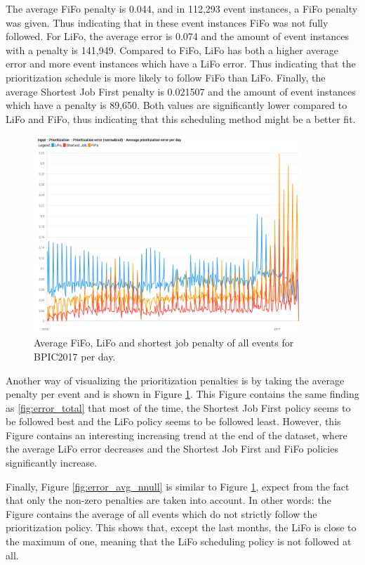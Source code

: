 The average FiFo penalty is 0.044, and in 112,293 event instances, a FiFo penalty was given. Thus indicating that in these event instances FiFo was not fully followed. For LiFo, the average error is 0.074 and the amount of event instances with a penalty is 141,949. Compared to FiFo, LiFo has both a higher average error and more event instances which have a LiFo error. Thus indicating that the prioritization schedule is more likely to follow FiFo than LiFo. Finally, the average Shortest Job First penalty is 0.021507 and the amount of event instances which have a penalty is 89,650. Both values are significantly lower compared to LiFo and FiFo, thus indicating that this scheduling method might be a better fit. 


\begin{figure}[h]
	\centering
    \includegraphics[width=0.9\textwidth]{figures/avg_prioritization_error.png}
    \caption{Average FiFo, LiFo and shortest job penalty of all events for BPIC2017 per day.}
    \label{fig:error_avg}
\end{figure}

Another way of visualizing the prioritization penalties is by taking the average penalty per event and is shown in Figure \ref{fig:error_avg}. This Figure contains the same finding as \ref{fig:error_total} that most of the time, the Shortest Job First policy seems to be followed best and the LiFo policy seems to be followed least. However, this Figure contains an interesting increasing trend at the end of the dataset, where the average LiFo error decreases and the Shortest Job First and FiFo policies significantly increase.  

Finally, Figure \ref{fig:error_avg_nnull} is similar to Figure \ref{fig:error_avg}, expect from the fact that only the non-zero penalties are taken into account. In other words: the Figure contains the average of all events which do not strictly follow the prioritization policy. This shows that, except the last months, the LiFo is close to the maximum of one, meaning that the LiFo scheduling policy is not followed at all. 

